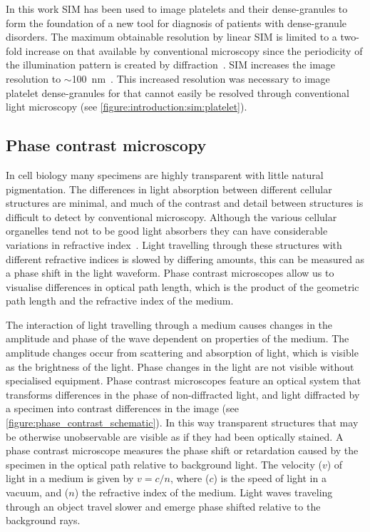 In this work SIM has been used to image platelets and their dense-granules to form the foundation of a new tool for diagnosis of patients with dense-granule disorders. The maximum obtainable resolution by linear SIM is limited to a two-fold increase on that available by conventional microscopy since the periodicity of the illumination pattern is created by diffraction~\cite{Gustafsson2000}. SIM increases the image resolution to $\sim$\SI{100}{\nano\meter}~\cite{Huang2010}. This increased resolution was necessary to image platelet dense-granules for that cannot easily be resolved through conventional light microscopy (see \autoref{figure:introduction:sim:platelet}).

\subsection{Phase contrast microscopy}
\label{introduction:microscopy:phase_contrast_microscopy}
In cell biology many specimens are highly transparent with little natural pigmentation. The differences in light absorption between different cellular structures are minimal, and much of the contrast and detail between structures is difficult to detect by conventional microscopy. Although the various cellular organelles tend not to be good light absorbers they can have considerable variations in refractive index~\cite{Murphy2012}. Light travelling through these structures with different refractive indices is slowed by differing amounts, this can be measured as a phase shift in the light waveform. Phase contrast microscopes allow us to visualise differences in optical path length, which is the product of the geometric path length and the refractive index of the medium. 

The interaction of light travelling through a medium causes changes in the amplitude and phase of the wave dependent on properties of the medium. The amplitude changes occur from scattering and absorption of light, which is visible as the brightness of the light. Phase changes in the light are not visible without specialised equipment. Phase contrast microscopes feature an optical system that transforms differences in the phase of non-diffracted light, and light diffracted by a specimen into contrast differences in the image (see \autoref{figure:phase_contrast_schematic}). In this way transparent structures that may be otherwise unobservable are visible as if they had been optically stained. A phase contrast microscope measures the phase shift or retardation caused by the specimen in the optical path relative to background light. The velocity ($v$) of light in a medium is given by  $v=c/n$, where ($c$) is the speed of light in a vacuum, and ($n$) the refractive index of the medium. Light waves traveling through an object travel slower and emerge phase shifted relative to the background rays.

